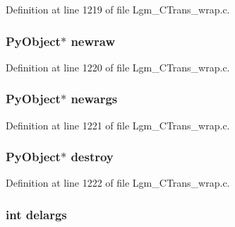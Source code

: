 Definition at line 1219 of file Lgm\_\-CTrans\_\-wrap.c.\hypertarget{struct_py_swig_client_data_c343cdc04c579bb3d46e9be516791975}{
\subsubsection[{newraw}]{\setlength{\rightskip}{0pt plus 5cm}PyObject$\ast$ {\bf newraw}}}
\label{struct_py_swig_client_data_c343cdc04c579bb3d46e9be516791975}




Definition at line 1220 of file Lgm\_\-CTrans\_\-wrap.c.\hypertarget{struct_py_swig_client_data_3f965a13b63b1a28ab3880b8852f89d0}{
\subsubsection[{newargs}]{\setlength{\rightskip}{0pt plus 5cm}PyObject$\ast$ {\bf newargs}}}
\label{struct_py_swig_client_data_3f965a13b63b1a28ab3880b8852f89d0}




Definition at line 1221 of file Lgm\_\-CTrans\_\-wrap.c.\hypertarget{struct_py_swig_client_data_16b3d2144ed476f6f20f3897a874c430}{
\subsubsection[{destroy}]{\setlength{\rightskip}{0pt plus 5cm}PyObject$\ast$ {\bf destroy}}}
\label{struct_py_swig_client_data_16b3d2144ed476f6f20f3897a874c430}




Definition at line 1222 of file Lgm\_\-CTrans\_\-wrap.c.\hypertarget{struct_py_swig_client_data_cb70a26b5c3b873ee8492f96d6f04722}{
\subsubsection[{delargs}]{\setlength{\rightskip}{0pt plus 5cm}int {\bf delargs}}}
\label{struct_py_swig_client_data_cb70a26b5c3b873ee8492f96d6f04722}




